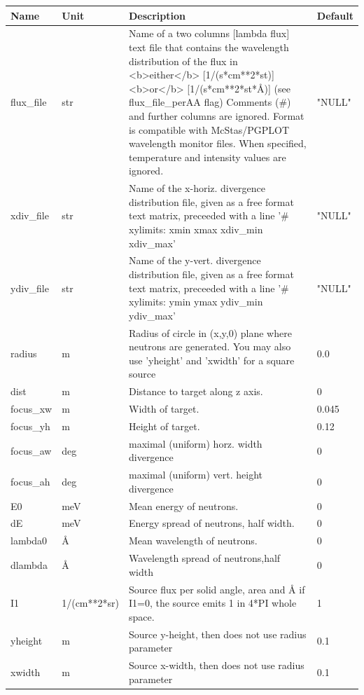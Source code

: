 \begin{longtable}{p{}p{}p{}p{}}
\toprule
\textbf{Name} & \textbf{Unit} & \textbf{Description} & \textbf{Default} \\
\midrule
\endhead
flux\_file & str & Name of a two columns [lambda flux] text file that contains the wavelength distribution of the flux in \textless{}b\textgreater{}either\textless{}/b\textgreater{} [1/(s*cm**2*st)] \textless{}b\textgreater{}or\textless{}/b\textgreater{} [1/(s*cm**2*st*\AA{})] (see flux\_file\_perAA flag) Comments (\#) and further columns are ignored. Format is compatible with McStas/PGPLOT wavelength monitor files. When specified, temperature and intensity values are ignored. & "NULL" \\
xdiv\_file & str & Name of the x-horiz. divergence distribution file, given as a free format text matrix, preceeded with a line '\# xylimits: xmin xmax xdiv\_min xdiv\_max' & "NULL" \\
ydiv\_file & str & Name of the y-vert. divergence distribution file, given as a free format text matrix, preceeded with a line '\# xylimits: ymin ymax ydiv\_min ydiv\_max' & "NULL" \\
radius & m & Radius of circle in (x,y,0) plane where neutrons are generated. You may also use 'yheight' and 'xwidth' for a square source & 0.0 \\
dist & m & Distance to target along z axis. & 0 \\
focus\_xw & m & Width of target. & 0.045 \\
focus\_yh & m & Height of target. & 0.12 \\
focus\_aw & deg & maximal (uniform) horz. width divergence & 0 \\
focus\_ah & deg & maximal (uniform) vert. height divergence & 0 \\
E0 & meV & Mean energy of neutrons. & 0 \\
dE & meV & Energy spread of neutrons, half width. & 0 \\
lambda0 & \AA{} & Mean wavelength of neutrons. & 0 \\
dlambda & \AA{} & Wavelength spread of neutrons,half width & 0 \\
I1 & 1/(cm**2*sr) & Source flux per solid angle, area and \AA{} if I1=0, the source emits 1 in 4*PI whole space. & 1 \\
yheight & m & Source y-height, then does not use radius parameter & 0.1 \\
xwidth & m & Source x-width, then does not use radius parameter & 0.1 \\

\end{longtable}

